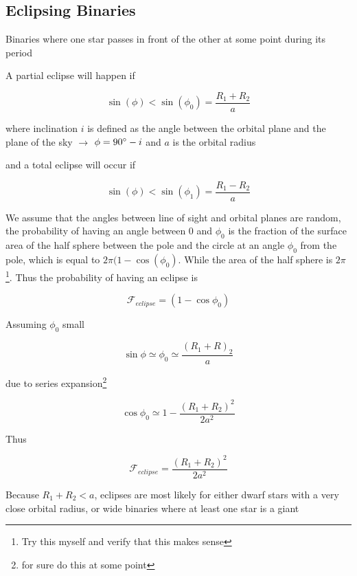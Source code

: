 \documentclass{article}
\begin{document}
\subsection{Eclipsing Binaries}
Binaries where one star passes in front of the other at some point during its period
\begin{list}{-}{}
\item A partial eclipse will happen if  
\item \[\sin(\phi) < \sin(\phi_0) = \frac{R_1+R_2}{a}\]
\item where inclination \(i\) is defined as the angle between the orbital plane and the plane of the sky \(\rightarrow\) \(\phi = 90 \degree - i\) and \(a\) is the orbital radius  
\item and a total eclipse will occur if 
\item \[\sin(\phi) < \sin(\phi_1) = \frac{R_1-R_2}{a}\]
\item We assume that the angles between line of sight and orbital planes are random, the probability of having an angle between 0 and \(\phi_0\) is the fraction of the surface area of the half sphere between the pole and the circle at an angle \(\phi_0\) from the pole, which is equal to \(2\pi(1-\cos(\phi_0)\). While the area of the half sphere is \(2\pi\)\footnote{Try this myself and verify that this makes sense}. Thus the probability of having an eclipse is 
\item \[\mathcal{F}_{eclipse} = (1-\cos\phi_0)\]
\item Assuming \(\phi_0\) small
\item \[\sin\phi \simeq \phi_0 \simeq \frac{(R_1 +R)_2}{a}\]
\item due to series expansion\footnote{for sure do this at some point}
\item \[\cos\phi_0 \simeq 1 - \frac{(R_1 + R_2)^2}{2a^2}\]
\item Thus
\item \[\mathcal{F}_{eclipse} =\frac{(R_1 + R_2)^2}{2a^2} \]
\item Because \(R_1 +R_2 < a\), eclipses are most likely for either dwarf stars with a  very close orbital radius, or wide binaries where at least one star is a giant 
\end{list}
\clearpage

\printglossaries
\end{document}
